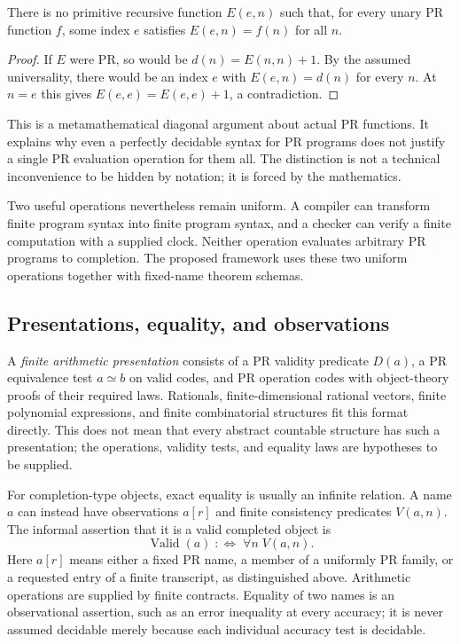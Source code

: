 \begin{proposition}
\label{prop:no-universal-pr-evaluator}
There is no primitive recursive function $E(e,n)$ such that, for every unary
PR function $f$, some index $e$ satisfies
$E(e,n)=f(n)$ for all $n$.
\end{proposition}

\begin{proof}
If $E$ were PR, so would be $d(n)=E(n,n)+1$.  By the assumed universality,
there would be an index $e$ with $E(e,n)=d(n)$ for every $n$.  At $n=e$ this
gives $E(e,e)=E(e,e)+1$, a contradiction.
\end{proof}

This is a metamathematical diagonal argument about actual PR functions.  It
explains why even a perfectly decidable syntax for PR programs does not
justify a single PR evaluation operation for them all.  The distinction is
not a technical inconvenience to be hidden by notation; it is forced by the
mathematics.

Two useful operations nevertheless remain uniform.  A compiler can
transform finite program syntax into finite program syntax, and a checker
can verify a finite computation with a supplied clock.  Neither operation
evaluates arbitrary PR programs to completion.  The proposed framework uses
these two uniform operations together with fixed-name theorem schemas.

\subsection{Presentations, equality, and observations}
\label{sec:presentations}

A \emph{finite arithmetic presentation} consists of a PR validity predicate
$D(a)$, a PR equivalence test $a\simeq b$ on valid codes, and PR operation
codes with object-theory proofs of their required laws.  Rationals,
finite-dimensional rational vectors, finite polynomial expressions, and
finite combinatorial structures fit this format directly.  This does not
mean that every abstract countable structure has such a presentation; the
operations, validity tests, and equality laws are hypotheses to be supplied.

For completion-type objects, exact equality is usually an infinite relation.
A name $a$ can instead have observations $a[r]$ and finite consistency
predicates $V(a,n)$.  The informal assertion that it is a valid completed
object is
\[
 \operatorname{Valid}(a)\;:\!\Longleftrightarrow\;\forall n\;V(a,n).
\]
Here $a[r]$ means either a fixed PR name, a member of a uniformly PR family,
or a requested entry of a finite transcript, as distinguished above.
Arithmetic operations are supplied by finite contracts.  Equality of two
names is an observational assertion, such as an error inequality at every
accuracy; it is never assumed decidable merely because each individual
accuracy test is decidable.

